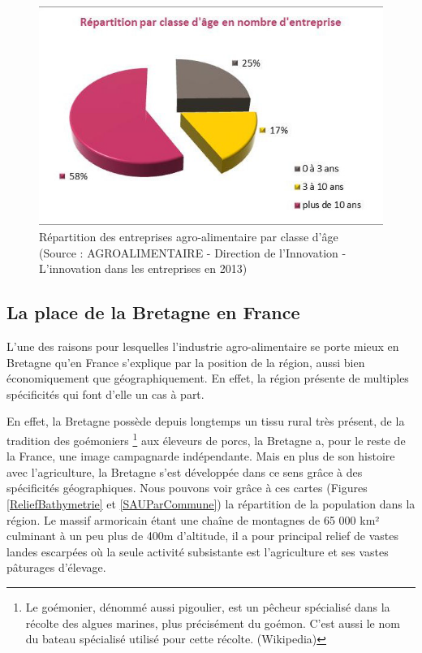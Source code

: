 \documentclass[a4paper,12pt]{report}
\begin{document}
	\begin{figure}[!h]
	\centering
	\includegraphics[scale=1]{Illustrations/RepartitionClasseAge.png}
	\caption{Répartition des entreprises agro-alimentaire par classe d'âge\\(Source : AGROALIMENTAIRE - Direction de l’Innovation - L’innovation dans les entreprises en 2013\cite{InnovationEntreprises2013})}
	\label{RepartitionParTaille}
	\end{figure}

		\subsection{La place de la Bretagne en France}
			L’une des raisons pour lesquelles l’industrie agro-alimentaire se porte mieux en Bretagne qu’en France s’explique par la position de la région, aussi bien économiquement que géographiquement. En effet, la région présente de multiples spécificités qui font d’elle un cas à part.
			
			En effet, la Bretagne possède depuis longtemps un tissu rural très présent, de la tradition des goémoniers \footnote{Le goémonier, dénommé aussi pigoulier, est un pêcheur spécialisé dans la récolte des algues marines, plus précisément du goémon. C'est aussi le nom du bateau spécialisé utilisé pour cette récolte. (Wikipedia)} aux éleveurs de porcs, la Bretagne a, pour le reste de la France, une image campagnarde indépendante. Mais en plus de son histoire avec l’agriculture, la Bretagne s’est développée dans ce sens grâce à des spécificités géographiques. Nous pouvons voir grâce à ces cartes (Figures \ref{ReliefBathymetrie} et \ref{SAUParCommune}) la répartition de la population dans la région. Le massif armoricain étant une chaîne de montagnes de 65 000 km² culminant à un peu plus de 400m d’altitude, il a pour principal relief de vastes landes escarpées où la seule activité subsistante est l’agriculture et ses vastes pâturages d’élevage.
			
\end{document}
